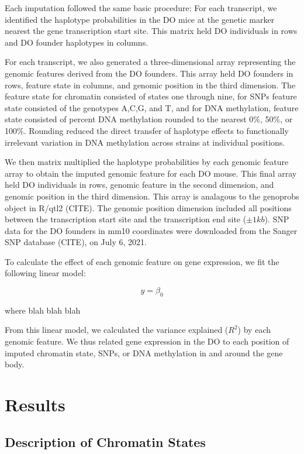\documentclass[10pt,letterpaper]{article}
\begin{document}
Each imputation followed the same basic procedure: For each transcript,
we identified the haplotype probabilities in the DO mice at the genetic
marker nearest the gene transcription start site. This matrix held DO
individuals in rows and DO founder haplotypes in columns.

For each transcript, we also generated a three-dimensional array
representing the genomic features derived from the DO founders. This
array held DO founders in rows, feature state in columns, and genomic
position in the third dimension. The feature state for chromatin
consisted of states one through nine, for SNPs feature state consisted
of the genotypes A,C,G, and T, and for DNA methylation, feature state
consisted of percent DNA methylation rounded to the nearest 0\%, 50\%,
or 100\%. Rounding reduced the direct transfer of haplotype effects to
functionally irrelevant variation in DNA methylation across strains at
individual positions.

We then matrix multiplied the haplotype probabilities by each genomic
feature array to obtain the imputed genomic feature for each DO mouse.
This final array held DO individuals in rows, genomic feature in the
second dimension, and genomic position in the third dimension. This
array is analagous to the genoprobs object in R/qtl2 (CITE). The genomic
position dimension included all positions between the transcription
start site and the transcription end site (\(\pm 1kb\)). SNP data for
the DO founders in mm10 coordinates were downloaded from the Sanger SNP
database (CITE), on July 6, 2021.

To calculate the effect of each genomic feature on gene expression, we
fit the following linear model:

\begin{equation*}
y=\beta_0
\end{equation*}

where blah blah blah

From this linear model, we calculated the variance explained (\(R^2\))
by each genomic feature. We thus related gene expression in the DO to
each position of imputed chromatin state, SNPs, or DNA methylation in
and around the gene body.

\hypertarget{results}{%
\section{Results}\label{results}}

\hypertarget{description-of-chromatin-states}{%
\subsection{Description of Chromatin
States}\label{description-of-chromatin-states}}
\end{document}
